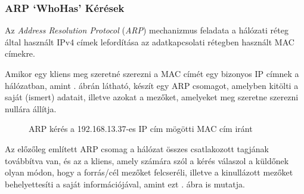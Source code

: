 \documentclass[a4paper,12pt]{article}
\begin{document}
\subsubsection{ARP `WhoHas' Kérések} \label{ssec:arpping}

	Az \textit{Address Resolution Protocol} (\textit{ARP}) mechanizmus feladata a hálózati réteg által használt IPv4 címek lefordítása az adatkapcsolati rétegben használt MAC címekre.
	
	Amikor egy kliens meg szeretné szerezni a MAC címét egy bizonyos IP címnek a hálózatban, amint \az{\ref{arpreq}}. ábrán látható, készít egy ARP csomagot, amelyben kitölti a saját (ismert) adatait, illetve azokat a mezőket, amelyeket meg szeretne szerezni nullára állítja.
	
	\begin{figure}[!htbp]
		\centering
		\caption{ARP kérés a 192.168.13.37-es IP cím mögötti MAC cím iránt}
		\label{arpreq}
	\end{figure}
	
	Az előzőleg említett ARP csomag a hálózat összes csatlakozott tagjának továbbítva van, és az a kliens, amely számára szól a kérés válaszol a küldőnek olyan módon, hogy a forrás/cél mezőket felcseréli, illetve a kinullázott mezőket behelyettesíti a saját információjával, amint ezt \az{\ref{arpresp}}. ábra is mutatja. 
	
\end{document}
